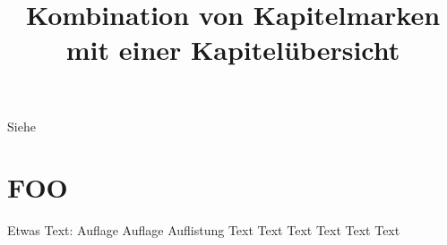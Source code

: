 \documentclass{dtk2}
\begin{document}
\title[Kurztitel 1]{Kombination von Kapitelmarken mit einer Kapitelübersicht}

\maketitle
\nocite{*}
Siehe~\cite{knuth:ct:a}

\section{FOO}

Etwas Text: Auflage Auf\-\hspace{0pt}lage Auflistung Text Text Text
Text Text Text

\clearpage

\printbibliography
\end{document}
